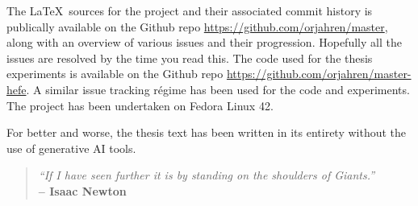 The \LaTeX~sources for the project and their associated commit history is publically available on
the Github repo \url{https://github.com/orjahren/master}, along with an overview of various issues
and their progression. Hopefully all the issues are resolved by the time you read this. The code
used for the thesis experiments is available on the Github repo
\url{https://github.com/orjahren/master-hefe}. A similar issue tracking régime has been used for the
code and experiments. The project has been undertaken on Fedora Linux 42.

For better and worse, the thesis text has been written in its entirety without the use of generative
AI tools.

\begin{center}
    \vspace{2em}
    \begin{quote}
        \emph{``If I have seen further it is by standing on the shoulders of Giants.''}\\
        \vspace{1em}
        \textbf{-- Isaac Newton}
    \end{quote}
    \vspace{2em}
\end{center}

